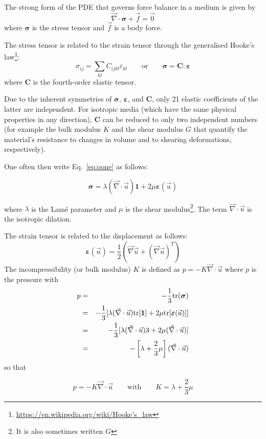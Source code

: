 The strong form of the PDE that governs force balance in a medium is given by
\[
\vec{\nabla}\cdot{\bm \sigma}  + \vec{f} = \vec{0}
\]
where ${\bm \sigma}$ is the stress tensor and $\vec{f}$ is a body force.

The stress tensor is related to the strain tensor through the generalised 
Hooke's law\footnote{\url{https://en.wikipedia.org/wiki/Hooke's_law}}:
\begin{equation}
\sigma_{ij}=\sum_{kl}C_{ijkl}\varepsilon_{kl} 
\qquad
\text{or}
\qquad
{\bm \sigma} = {\bm C} : {\bm \varepsilon}
\label{eq:oone}
\end{equation}
where ${\bm C}$ is the fourth-order elastic tensor.

Due to the inherent symmetries of ${\bm \sigma}$, ${\bm \varepsilon}$, and ${\bm C}$, 
only 21 elastic coefficients of the latter are independent. 
For isotropic media (which have the same physical properties in any direction), ${\bm C}$ 
can be reduced to only two independent numbers (for example the bulk modulus $K$ and the shear modulus $G$ 
that quantify the material's resistance to changes in volume and to shearing deformations, respectively). 

One often then write Eq.~\eqref{eq:oone} as follows:

\begin{mdframed}[backgroundcolor=blue!5]
\begin{equation}
{\bm \sigma} = \lambda (\vec{\nabla}\cdot\vec{u}) {\bm 1} + 2\mu {\bm \varepsilon}(\vec{u})   \label{eq:twoELAST}
\end{equation}
\end{mdframed}
where $\lambda$ is the Lam\'e parameter and $\mu$ is the shear modulus\footnote{It is also sometimes written $G$}.
The term $\vec{\nabla}\cdot\vec{u}$ is the isotropic dilation.


The strain tensor is related to the displacement as follows: 
\[
{\bm \varepsilon}(\vec{u}) 
= \frac{1}{2}(\vec{\nabla}\vec{u} + (\vec{\nabla}\vec{u})^T)
\]
The incompressibility (or bulk modulus) $K$ is defined as $p=-K \vec{\nabla}\cdot\vec{u}$ 
where $p$ is the pressure with 
\begin{eqnarray}
p&=&-\frac{1}{3} \text{tr}({\bm \sigma}) \nonumber\\
 &=& -\frac{1}{3} [ \lambda (\vec{\nabla}\cdot\vec{u}) \text{tr}[{\bm 1}] + 2 \mu {\rm tr}[{\bm \varepsilon}(\vec{u})]] \nonumber\\
 &=& -\frac{1}{3} [ \lambda (\vec{\nabla}\cdot\vec{u})  3  + 2 \mu  (\vec{\nabla}\cdot\vec{u}) ] \nonumber\\
 &=& -\left[ \lambda + \frac{2}{3} \mu \right] (\vec{\nabla}\cdot\vec{u})  
\end{eqnarray}
so that 
\begin{mdframed}[backgroundcolor=blue!5]
\[
p=-K \vec{\nabla}\cdot\vec{u} 
\qquad
\text{with}
\qquad
K=\lambda+\frac{2}{3}\mu
\]
\end{mdframed}


